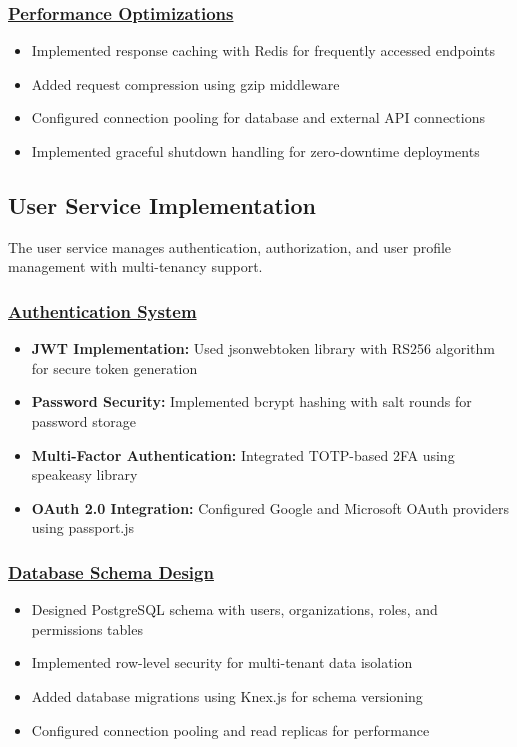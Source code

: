 \subsubsection*{\underline{Performance Optimizations}}
\begin{itemize}
    \item Implemented response caching with Redis for frequently accessed endpoints
    \item Added request compression using gzip middleware
    \item Configured connection pooling for database and external API connections
    \item Implemented graceful shutdown handling for zero-downtime deployments
\end{itemize}

\subsection{User Service Implementation}
The user service manages authentication, authorization, and user profile management with multi-tenancy support.

\subsubsection*{\underline{Authentication System}}
\begin{itemize}
    \item \textbf{JWT Implementation:} Used jsonwebtoken library with RS256 algorithm for secure token generation
    \item \textbf{Password Security:} Implemented bcrypt hashing with salt rounds for password storage
    \item \textbf{Multi-Factor Authentication:} Integrated TOTP-based 2FA using speakeasy library
    \item \textbf{OAuth 2.0 Integration:} Configured Google and Microsoft OAuth providers using passport.js
\end{itemize}

\subsubsection*{\underline{Database Schema Design}}
\begin{itemize}
    \item Designed PostgreSQL schema with users, organizations, roles, and permissions tables
    \item Implemented row-level security for multi-tenant data isolation
    \item Added database migrations using Knex.js for schema versioning
    \item Configured connection pooling and read replicas for performance
\end{itemize}

